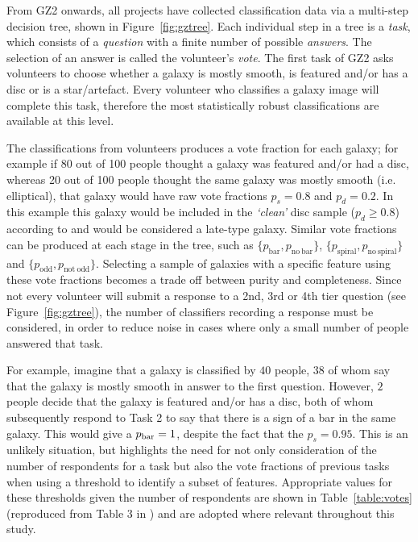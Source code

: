 From GZ2 onwards, all projects have collected classification data via a multi-step decision tree, shown in Figure~\ref{fig:gztree}.  Each individual step in a tree is a \emph{task}, which consists of a \emph{question} with a finite number of possible \emph{answers}. The selection of an answer is called the volunteer's \emph{vote}. The first task of GZ2 asks volunteers to choose whether a galaxy is mostly smooth, is featured and/or has a disc or is a star/artefact. Every volunteer who classifies a galaxy image will complete this task, therefore the most statistically robust classifications are available at this level.


The classifications from volunteers produces a vote fraction for each galaxy; for example if 80 out of 100 people thought a galaxy was featured and/or had a disc, whereas 20 out of 100 people thought the same galaxy was mostly smooth (i.e. elliptical), that galaxy would have raw vote fractions $p_{s} = 0.8$ and $p_{d} = 0.2$. In this example this galaxy would be included in the \emph{`clean'} disc sample ($p_d \geq 0.8$) according to \cite{GZ2} and would be considered a late-type galaxy. Similar vote fractions can be produced at each stage in the tree, such as $\{p_{\mathrm{bar}}, p_{\mathrm{no~bar}}\}$, $\{p_{\mathrm{spiral}}, p_{\mathrm{no~spiral}}\}$ and $\{p_{\mathrm{odd}}, p_{\mathrm{not~odd}}\}$. Selecting a sample of galaxies with a specific feature using these vote fractions becomes a trade off between purity and completeness. Since not every volunteer will submit a response to a 2nd, 3rd or 4th tier question (see Figure~\ref{fig:gztree}), the number of classifiers recording a response must be considered, in order to reduce noise in cases where only a small number of people answered that task. 

For example, imagine that a galaxy is classified by $40$ people, $38$ of whom say that the galaxy is mostly smooth in answer to the first question. However, $2$ people decide that the galaxy is featured and/or has a disc, both of whom subsequently respond to Task 2 to say that there is a sign of a bar in the same galaxy. This would give a $p_{\rm{bar}}=1$, despite the fact that the $p_s = 0.95$. This is an unlikely situation, but highlights the need for not only consideration of the number of respondents for a task but also the vote fractions of previous tasks when using a threshold to identify a subset of features. Appropriate values for these thresholds given the number of respondents are shown in Table~\ref{table:votes} (reproduced from Table 3 in \citealt{GZ2}) and are adopted where relevant throughout this study. 

